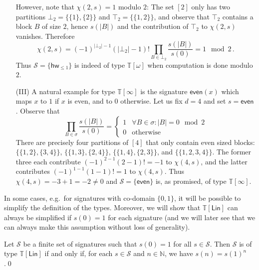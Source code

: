 \documentclass[authorcolumns,numberwithinsect]{no-lipics-v2022}
\begin{document}
\begin{itemize}
    However, note that $\chi(2,s)=1$ modulo $2$: The set $[2]$ only has two partitions $\bot_2=\{\{1\},\{2\}\}$ and $\top_2=\{\{1,2\}\}$, and observe that $\top_2$ contains a block $B$ of size $2$, hence $s(|B|)$ and the contribution of $\top_2$ to $\chi(2,s)$ vanishes. Therefore 
    \[ \chi(2,s) = (-1)^{|\bot_2|-1}(|\bot_2|-1)! \prod_{B\in \bot_2} \frac{s(|B|)}{s(0)} = 1 \mod 2 \,. \]
    Thus $\mathcal{S}=\{\mathsf{hw}_{\leq 1}\}$ is indeed of type $\mathbb{T}[\mathsf{\omega}]$ when computation is done modulo $2$.
    \item[(III)] A natural example for type $\mathbb{T}[\mathsf{\infty}]$ is the signature $\mathsf{even}(x)$ which maps $x$ to $1$ if $x$ is even, and to $0$ otherwise. Let us fix $d=4$ and set $s=\mathsf{even}$. Observe that \[\prod_{B\in \sigma}\frac{s(|B|)}{s(0)} = \begin{cases}
        1 & \forall B\in \sigma: |B|=0 \mod 2\\
        0 & \text{otherwise}
    \end{cases}\]
    There are precisely four partitions of $[4]$ that only contain even sized blocks: $\{\{1,2\},\{3,4\}\}$, $\{\{1,3\},\{2,4\}\}$, $\{\{1,4\},\{2,3\}\}$, and $\{\{1,2,3,4\}\}$. The former three each contribute $(-1)^{2-1} (2-1)! = -1$ to $\chi(4,s)$, and the latter contributes $(-1)^{1-1}(1-1)!=1$ to $\chi(4,s)$. Thus $\chi(4,s)=-3+1=-2\neq 0$ and $\mathcal{S}=\{\mathsf{even}\}$ is, as promised, of type $\mathbb{T}[\mathsf{\infty}]$. 
\end{itemize}

In some cases, e.g.\ for signatures with co-domain $\{0,1\}$, it will be possible to simplify the definition of the types. Moreover, we will show that $\mathbb{T}[\mathsf{Lin}]$ can always be simplified if $s(0)=1$ for each signature (and we will later see that we can always make this assumption without loss of generality).
\begin{lemma}\label{lem:simplify_type_1_intro}
Let $\mathcal{S}$ be a finite set of signatures such that $s(0)=1$ for all $s\in \mathcal{S}$. Then
$\mathcal{S}$ is of type $\mathbb{T}[\mathsf{Lin}]$ if and only if, for each $s\in \mathcal{S}$ and $n\in \mathbb{N}$, we have $s(n)=s(1)^n$.\qed
\end{lemma}
\end{document}
